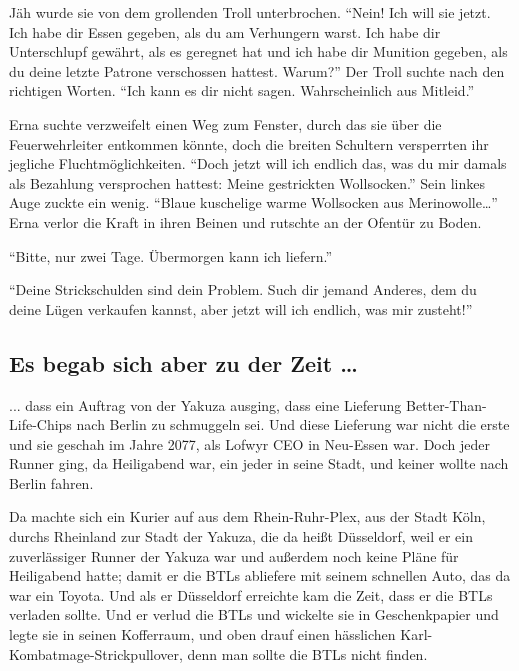 Jäh wurde sie von dem grollenden Troll unterbrochen.
\enquote{Nein! Ich will sie jetzt. Ich habe dir Essen gegeben, als du am Verhungern warst. Ich habe dir Unterschlupf gewährt, als es geregnet hat und ich habe dir Munition gegeben, als du deine letzte Patrone verschossen hattest. Warum?} Der Troll suchte nach den richtigen Worten. \enquote{Ich kann es dir nicht sagen. Wahrscheinlich aus Mitleid.}

Erna suchte verzweifelt einen Weg zum Fenster, durch das sie über die Feuerwehrleiter entkommen könnte, doch die breiten Schultern versperrten ihr jegliche Fluchtmöglichkeiten.
\enquote{Doch jetzt will ich endlich das, was du mir damals als Bezahlung versprochen hattest: Meine gestrickten Wollsocken.} Sein linkes Auge zuckte ein wenig. \enquote{Blaue kuschelige warme Wollsocken aus Merinowolle\dots}
Erna verlor die Kraft in ihren Beinen und rutschte an der Ofentür zu Boden.

\enquote{Bitte, nur zwei Tage. Übermorgen kann ich liefern.}

\enquote{Deine Strickschulden sind dein Problem. Such dir jemand Anderes, dem du deine Lügen verkaufen kannst, aber jetzt will ich endlich, was mir zusteht!}

\subsection{Es begab sich aber zu der Zeit …}
... dass ein Auftrag von der Yakuza ausging, dass eine Lieferung Better-Than-Life-Chips nach Berlin zu schmuggeln sei.
Und diese Lieferung war nicht die erste und sie geschah im Jahre 2077, als Lofwyr CEO in Neu-Essen war.
Doch jeder Runner ging, da Heiligabend war, ein jeder in seine Stadt, und keiner wollte nach Berlin fahren.

Da machte sich ein Kurier auf aus dem Rhein-Ruhr-Plex, aus der Stadt Köln, durchs Rheinland zur Stadt der Yakuza, die da heißt Düsseldorf, weil er ein zuverlässiger Runner der Yakuza war und außerdem noch keine Pläne für Heiligabend hatte; damit er die BTLs abliefere mit seinem schnellen Auto, das da war ein Toyota.
Und als er Düsseldorf erreichte kam die Zeit, dass er die BTLs verladen sollte.
Und er verlud die BTLs und wickelte sie in Geschenkpapier und legte sie in seinen Kofferraum, und oben drauf einen hässlichen Karl-Kombatmage-Strickpullover, denn man sollte die BTLs nicht finden.

